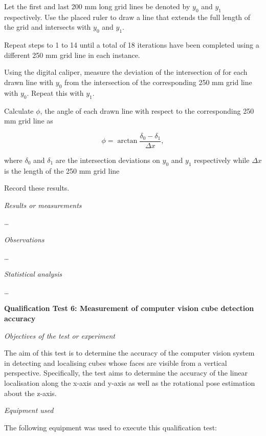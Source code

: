 \begin{compactenum}
	\item Let the first and last 200 mm long grid lines be denoted by $y_0$ and $y_1$ respectively. Use the placed ruler to draw a line that extends the full length of the grid and intersects with $y_0$ and $y_1$.
	\item Repeat steps to 1 to 14 until a total of 18 iterations have been completed using a different 250 mm grid line in each instance.
	\item Using the digital caliper, measure the deviation of the intersection of for each drawn line with $y_0$ from the intersection of the corresponding 250 mm grid line with $y_0$. Repeat this with $y_1$.
	\item Calculate $\phi$, the angle of each drawn line with respect to the corresponding 250 mm grid line as
	
\begin{equation}
	\phi=\arctan\frac{\delta_0-\delta_1}{\Delta x},
\end{equation}

	where $\delta_0$ and $\delta_1$ are the intersection deviations on $y_0$ and $y_1$ respectively while $\Delta x$ is the length of the 250 mm grid line
	\item Record these results.
\end{compactenum}



\textit{Results or measurements}

\ldots

\textit{Observations}

\ldots

\textit{Statistical analysis}

\ldots

\textbf{Qualification Test 6: Measurement of computer vision cube detection accuracy}

\textit{Objectives of the test or experiment}

The aim of this test is to determine the accuracy of the computer vision system in detecting and localising cubes whose faces are visible from a vertical perspective. Specifically, the test aims to determine the accuracy of the linear localisation along the x-axis and y-axis as well as the rotational pose estimation about the z-axis.

\textit{Equipment used}

The following equipment was used to execute this qualification test:

